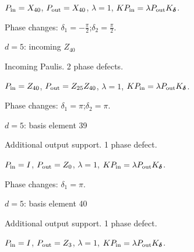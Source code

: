 \vspace{-1mm}
$P_{\rm in}=X_{40}$, \quad $P_{\rm out}=X_{40}$, \quad $\lambda=1$, \qquad $K P_{\rm in}=\lambda P_{\rm out}K_{\boldsymbol\delta}$.
\par\smallskip\begin{minipage}{.98\linewidth}\small Phase changes: $\delta_{1}=-\frac{\pi}{2}$;\quad $\delta_{2}=\frac{\pi}{2}$.\end{minipage}
\vfill
{\footnotesize\texttt{}}
\newpage
{}
{\Large $d=5$: incoming $Z_{40}$}\par
Incoming Paulis. 2 phase defects.
\begin{center}
\end{center}
\vspace{-1mm}
$P_{\rm in}=Z_{40}$, \quad $P_{\rm out}=Z_{25}Z_{40}$, \quad $\lambda=1$, \qquad $K P_{\rm in}=\lambda P_{\rm out}K_{\boldsymbol\delta}$.
\par\smallskip\begin{minipage}{.98\linewidth}\small Phase changes: $\delta_{1}=\pi$;\quad $\delta_{2}=\pi$.\end{minipage}
\vfill
{\footnotesize\texttt{}}
\newpage
{}
{\Large $d=5$: basis element 39}\par
Additional output support. 1 phase defect.
\begin{center}
\end{center}
\vspace{-1mm}
$P_{\rm in}=I$, \quad $P_{\rm out}=Z_{0}$, \quad $\lambda=1$, \qquad $K P_{\rm in}=\lambda P_{\rm out}K_{\boldsymbol\delta}$.
\par\smallskip\begin{minipage}{.98\linewidth}\small Phase changes: $\delta_{1}=\pi$.\end{minipage}
\vfill
{\footnotesize\texttt{}}
\newpage
{}
{\Large $d=5$: basis element 40}\par
Additional output support. 1 phase defect.
\begin{center}
\end{center}
\vspace{-1mm}
$P_{\rm in}=I$, \quad $P_{\rm out}=Z_{3}$, \quad $\lambda=1$, \qquad $K P_{\rm in}=\lambda P_{\rm out}K_{\boldsymbol\delta}$.
